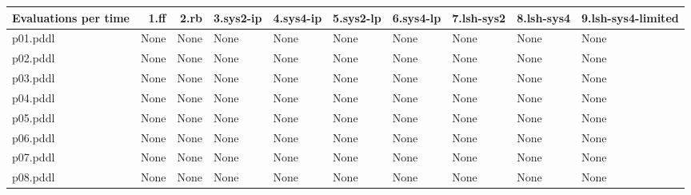 \documentclass{article}
\begin{document}
\begin{tabular}{@{}lrrrrrrrrr@{}}
Evaluations per time & 1.ff & 2.rb & 3.sys2-ip & 4.sys4-ip & 5.sys2-lp & 6.sys4-lp & 7.lsh-sys2 & 8.lsh-sys4 & 9.lsh-sys4-limited \\
\midrule
p01.pddl & \multicolumn{1}{|l|}{None} & \multicolumn{1}{|l|}{None} & \multicolumn{1}{|l|}{None} & \multicolumn{1}{|l|}{None} & \multicolumn{1}{|l|}{None} & \multicolumn{1}{|l|}{None} & \multicolumn{1}{|l|}{None} & \multicolumn{1}{|l|}{None} & \multicolumn{1}{|l|}{None} \\
p02.pddl & \multicolumn{1}{|l|}{None} & \multicolumn{1}{|l|}{None} & \multicolumn{1}{|l|}{None} & \multicolumn{1}{|l|}{None} & \multicolumn{1}{|l|}{None} & \multicolumn{1}{|l|}{None} & \multicolumn{1}{|l|}{None} & \multicolumn{1}{|l|}{None} & \multicolumn{1}{|l|}{None} \\
p03.pddl & \multicolumn{1}{|l|}{None} & \multicolumn{1}{|l|}{None} & \multicolumn{1}{|l|}{None} & \multicolumn{1}{|l|}{None} & \multicolumn{1}{|l|}{None} & \multicolumn{1}{|l|}{None} & \multicolumn{1}{|l|}{None} & \multicolumn{1}{|l|}{None} & \multicolumn{1}{|l|}{None} \\
p04.pddl & \multicolumn{1}{|l|}{None} & \multicolumn{1}{|l|}{None} & \multicolumn{1}{|l|}{None} & \multicolumn{1}{|l|}{None} & \multicolumn{1}{|l|}{None} & \multicolumn{1}{|l|}{None} & \multicolumn{1}{|l|}{None} & \multicolumn{1}{|l|}{None} & \multicolumn{1}{|l|}{None} \\
p05.pddl & \multicolumn{1}{|l|}{None} & \multicolumn{1}{|l|}{None} & \multicolumn{1}{|l|}{None} & \multicolumn{1}{|l|}{None} & \multicolumn{1}{|l|}{None} & \multicolumn{1}{|l|}{None} & \multicolumn{1}{|l|}{None} & \multicolumn{1}{|l|}{None} & \multicolumn{1}{|l|}{None} \\
p06.pddl & \multicolumn{1}{|l|}{None} & \multicolumn{1}{|l|}{None} & \multicolumn{1}{|l|}{None} & \multicolumn{1}{|l|}{None} & \multicolumn{1}{|l|}{None} & \multicolumn{1}{|l|}{None} & \multicolumn{1}{|l|}{None} & \multicolumn{1}{|l|}{None} & \multicolumn{1}{|l|}{None} \\
p07.pddl & \multicolumn{1}{|l|}{None} & \multicolumn{1}{|l|}{None} & \multicolumn{1}{|l|}{None} & \multicolumn{1}{|l|}{None} & \multicolumn{1}{|l|}{None} & \multicolumn{1}{|l|}{None} & \multicolumn{1}{|l|}{None} & \multicolumn{1}{|l|}{None} & \multicolumn{1}{|l|}{None} \\
p08.pddl & \multicolumn{1}{|l|}{None} & \multicolumn{1}{|l|}{None} & \multicolumn{1}{|l|}{None} & \multicolumn{1}{|l|}{None} & \multicolumn{1}{|l|}{None} & \multicolumn{1}{|l|}{None} & \multicolumn{1}{|l|}{None} & \multicolumn{1}{|l|}{None} & \multicolumn{1}{|l|}{None} \\

\end{tabular}
\end{document}
